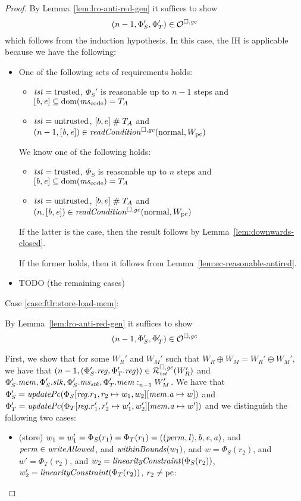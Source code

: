 \begin{proof}
  By Lemma~\ref{lem:lro-anti-red-gen} it suffices to show
  \[
    \npair[n-1]{\Phi_S',\Phi_T'} \in \lro
  \]
  which follows from the induction hypothesis.
  In this case, the IH is applicable because we have the following:
  \begin{itemize}
  \item One of the following sets of requirements holds:
    \begin{itemize}
    \item $\trust = \trusted$, $\Phi_S'$ is reasonable up to $n-1$ steps and $[\baddr,\eaddr] \subseteq \dom(\mscode) = \ta$
    \item $\trust = \untrusted$, $[b,e] \mathrel{\#} \ta$ and $\npair[n-1]{[\baddr,\eaddr]} \in \readCond{\normal,W_\pcreg}$
    \end{itemize}

    We know one of the following holds:
    \begin{itemize}
    \item $\trust = \trusted$, $\Phi_S$ is reasonable up to $n$ steps and $[\baddr,\eaddr] \subseteq \dom(\mscode) = \ta$
    \item $\trust = \untrusted$, $[b,e] \mathrel{\#} \ta$ and $\npair{[\baddr,\eaddr]} \in \readCond{\normal,W_\pcreg}$
    \end{itemize}
    If the latter is the case, then the result follows by Lemma~\ref{lem:downwards-closed}.

    If the former holds, then it follows from Lemma~\ref{lem:ec-reasonable-antired}.

    \item TODO (the remaining cases)
  \end{itemize}

  Case \ref{case:ftlr:store-load-mem}:

  By Lemma~\ref{lem:lro-anti-red-gen} it suffices to show
  \[
    \npair[n-1]{\Phi_S',\Phi_T'} \in \lro
  \]

  First, we show that for some $W_R'$ and $W_M'$ such that $W_R \oplus W_M = W_R' \oplus W_M'$, we have that $\npair[n-1]{(\Phi_S'.\reg,\Phi_T'.\reg)} \in \lrrg{\trust}(W_R')$ and $\memSat[n-1]{\Phi_S'.\mem,\Phi_S'.\stk,\Phi_S'.\ms_\stk,\Phi_T'.\mem}{W_M'}$.
  We have that $\Phi_S' = \updPcAddr{\Phi_S\updReg{r_1,r_2}{w_1,w_2}\update{\mem.\aaddr}{w}}$ and $\Phi_T' = \updPcAddr{\Phi_T\updReg{r_1',r_2'}{w_1',w_2'}\update{\mem.\aaddr}{w'}}$ and we distinguish the following two cases:
  \begin{itemize}
  \item (store) $w_1 = w_1' = \Phi_S(r_1) = \Phi_T(r_1) =
    ((\perm,\lin),\baddr,\eaddr,\aaddr)$, and $\perm \in \writeAllowed{}$,
    and
    $\withinBounds{w_1}$, and
    $w = \Phi_S(r_2)$, and $w' = \Phi_T(r_2)$, and $w_2 = \linCons{\Phi_S(r_2)}$, $w_2' = \linCons{\Phi_T(r_2)}$,  $r_2 \neq \pcreg$:


\end{itemize}
\end{proof}
